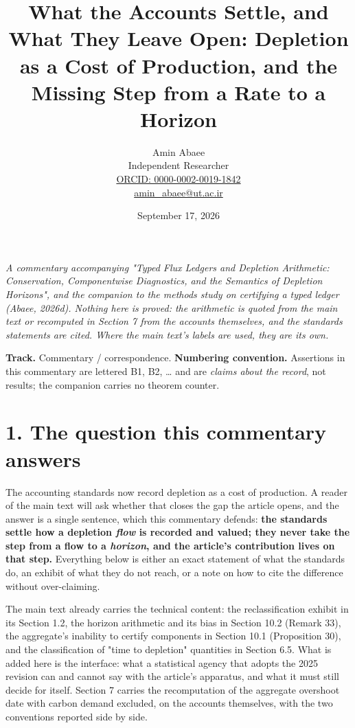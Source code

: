 \documentclass[11pt]{article}
\begin{document}
\title{What the Accounts Settle, and What They Leave Open: Depletion as a Cost of Production, and the Missing Step from a Rate to a Horizon}
\author{Amin Abaee\\[0.35em]
{\small Independent Researcher}\\[0.55em]
{\small\href{https://orcid.org/0000-0002-0019-1842}{ORCID: 0000-0002-0019-1842}}\\[0.3em]
{\small\href{mailto:amin\_abaee@ut.ac.ir}{amin\_abaee@ut.ac.ir}}}
\date{September 17, 2026}
\maketitle

\emph{A commentary accompanying "Typed Flux Ledgers and Depletion Arithmetic: Conservation, Componentwise Diagnostics, and the Semantics of Depletion Horizons", and the companion to the methods study on certifying a typed ledger (Abaee, 2026d). Nothing here is proved: the arithmetic is quoted from the main text or recomputed in Section 7 from the accounts themselves, and the standards statements are cited. Where the main text's labels are used, they are its own.}

\textbf{Track.} Commentary / correspondence. \textbf{Numbering convention.} Assertions in this commentary are lettered B1, B2, \ldots{} and are \emph{claims about the record}, not results; the companion carries no theorem counter.

\vspace{0.8em}

\section*{1. The question this commentary answers}\label{1-the-question-this-commentary-answers}

The accounting standards now record depletion as a cost of production. A reader of the main text will ask whether that closes the gap the article opens, and the answer is a single sentence, which this commentary defends: \textbf{the standards settle how a depletion \emph{flow} is recorded and valued; they never take the step from a flow to a \emph{horizon}, and the article's contribution lives on that step.} Everything below is either an exact statement of what the standards do, an exhibit of what they do not reach, or a note on how to cite the difference without over-claiming.

The main text already carries the technical content: the reclassification exhibit in its Section 1.2, the horizon arithmetic and its bias in Section 10.2 (Remark 33), the aggregate's inability to certify components in Section 10.1 (Proposition 30), and the classification of "time to depletion" quantities in Section 6.5. What is added here is the interface: what a statistical agency that adopts the 2025 revision can and cannot say with the article's apparatus, and what it must still decide for itself. Section 7 carries the recomputation of the aggregate overshoot date with carbon demand excluded, on the accounts themselves, with the two conventions reported side by side.
\end{document}
